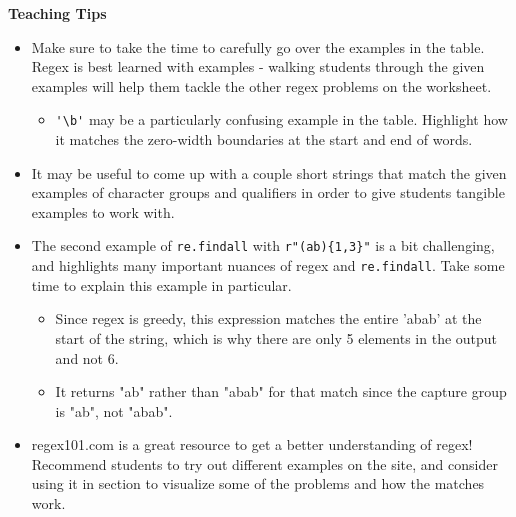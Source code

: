 \begin{guide}
\begin{blocksection}
\textbf{Teaching Tips}
    \begin{itemize}
        \item Make sure to take the time to carefully go over the examples in the table. Regex is best learned with examples - walking students through the given examples will help them tackle the other regex problems on the worksheet.
        \begin{itemize}
            \item \lstinline{'\b'} may be a particularly confusing example in the table. Highlight how it matches the zero-width boundaries at the start and end of words.
        \end{itemize}
        \item It may be useful to come up with a couple short strings that match the given examples of character groups and qualifiers in order to give students tangible examples to work with.
        \item The second example of \lstinline{re.findall} with \lstinline$r"(ab){1,3}"$ is a bit challenging, and highlights many important nuances of regex and \lstinline{re.findall}. Take some time to explain this example in particular.
        \begin{itemize}
            \item Since regex is greedy, this expression matches the entire 'abab' at the start of the string, which is why there are only 5 elements in the output and not 6.
            \item It returns "ab" rather than "abab" for that match since the capture group is "ab", not "abab". 
        \end{itemize}
        \item regex101.com is a great resource to get a better understanding of regex! Recommend students to try out different examples on the site, and consider using it in section to visualize some of the problems and how the matches work.
    \end{itemize}
\end{blocksection}
\end{guide}
    
